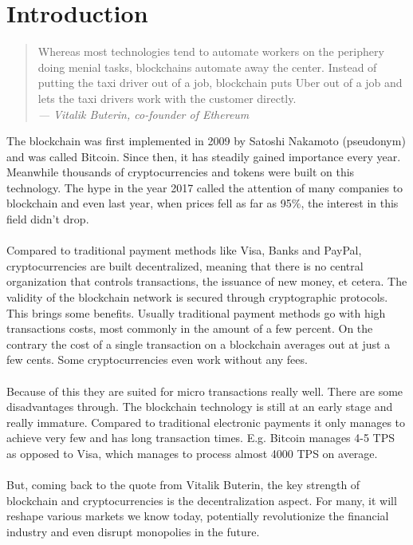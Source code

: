 \section{Introduction}
\begin{quote}
  Whereas most technologies tend to automate workers on the periphery doing menial tasks, blockchains automate away the center. Instead of putting the taxi driver out of a job, blockchain puts Uber out of a job and lets the taxi drivers work with the customer directly.
  \\
  {\textit{— Vitalik Buterin, co-founder of Ethereum}}
\end{quote}

The blockchain was first implemented in 2009 by Satoshi Nakamoto (pseudonym) and was called Bitcoin. Since then, it has steadily gained importance every year. Meanwhile thousands of cryptocurrencies and tokens were built on this technology. The hype in the year 2017 called the attention of many companies to blockchain and even last year, when prices fell as far as 95\%, the interest in this field didn’t drop.
\\\\
Compared to traditional payment methods like Visa, Banks and PayPal, cryptocurrencies are built decentralized, meaning that there is no central organization that controls transactions, the issuance of new money, et cetera. The validity of the blockchain  network is secured through cryptographic protocols. This brings some benefits. Usually traditional payment methods go with high transactions costs, most commonly in the amount of a few percent. On the contrary the cost of a single transaction on a blockchain averages out at just a few cents\cite{ethereum-fee}. Some cryptocurrencies even work without any fees.
\\\\
Because of this they are suited for micro transactions really well. There are some disadvantages through. The blockchain technology is still at an early stage and really immature. Compared to traditional electronic payments it only manages to achieve very few  and has long transaction times. E.g. Bitcoin manages 4-5 TPS\cite{bitcoinTPS} as opposed to Visa, which manages to process almost 4000 TPS on average\cite{visa}.
\\\\
But, coming back to the quote from Vitalik Buterin, the key strength of blockchain and cryptocurrencies is the decentralization aspect. For many, it will reshape various markets we know today, potentially revolutionize the financial industry and even disrupt monopolies in the future.
